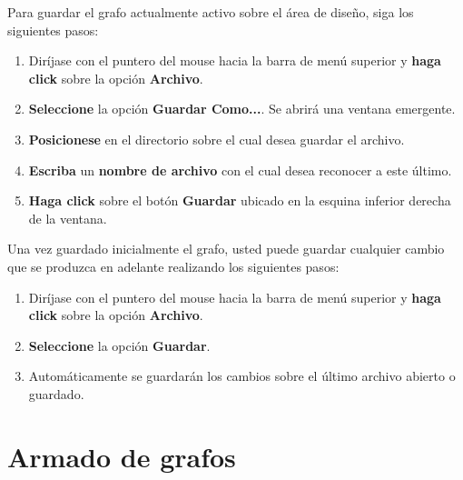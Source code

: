 \documentclass{book}
\begin{document}
Para guardar el grafo actualmente activo sobre el área de diseño, siga los siguientes pasos:
\medskip

\begin{enumerate}
	\itemsep=8pt \topsep=0pt \partopsep=0pt \parskip=0pt \parsep=0pt

	\item Diríjase con el puntero del mouse hacia la barra de menú superior y \textbf{haga click} sobre la opción \textbf{Archivo}.

	\item \textbf{Seleccione} la opción \textbf{Guardar Como...}. Se abrirá una ventana emergente.

	\item \textbf{Posicionese} en el directorio sobre el cual desea guardar el archivo.

	\item \textbf{Escriba} un \textbf{nombre de archivo} con el cual desea reconocer a este último.

	\item \textbf{Haga click} sobre el botón \textbf{Guardar} ubicado en la esquina inferior derecha de la ventana.

\end{enumerate}
\medskip


Una vez guardado inicialmente el grafo, usted puede guardar cualquier cambio que se produzca en adelante realizando los siguientes pasos:

\begin{enumerate}
	\itemsep=8pt \topsep=0pt \partopsep=0pt \parskip=0pt \parsep=0pt

	\item Diríjase con el puntero del mouse hacia la barra de menú superior y \textbf{haga click} sobre la opción \textbf{Archivo}.

	\item \textbf{Seleccione} la opción \textbf{Guardar}.

	\item Automáticamente se guardarán los cambios sobre el último archivo abierto o guardado.

\end{enumerate}
\medskip




%
%
\chapter{Armado de grafos}
\end{document}
